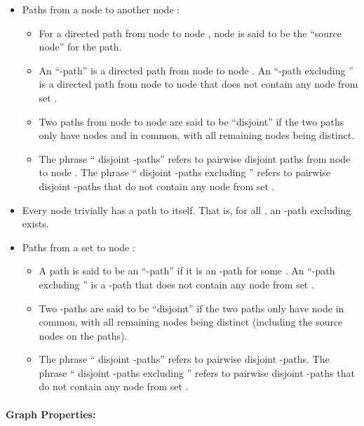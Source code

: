 \documentclass[letterpaper, 11pt]{article}
\begin{document}
\begin{itemize}
\item Paths from a node  to another node :
\begin{itemize}
\item For a directed path from node  to node , node  is said to be the ``source node'' for the path.
\item An ``-path'' is a directed path from node  to node . An ``-path excluding '' is a directed path from node  to node  that does not contain any node from set . 


\item Two paths from node  to node  are said to be ``disjoint'' 
	if the two paths only have nodes  and 
	in common, with all remaining
	nodes being distinct.
	
\item The phrase `` disjoint -paths'' refers to
	 pairwise disjoint paths from node  to node . The phrase `` disjoint -paths excluding '' refers to  pairwise disjoint -paths that do not contain any node from set .

\end{itemize}
\item Every node  trivially has a path to itself. That is,
	for all , an -path
	excluding  exists.
\item Paths from a set  to node :

\begin{itemize}
\item A path is said to be an ``-path'' if it is an
	-path for some . An ``-path excluding '' is a -path that does not contain any node from set .


\item Two -paths are said to be ``disjoint'' 
	if the two paths only have node 
	in common, with all remaining
	nodes being distinct (including the source nodes on the paths).
	
\item The phrase `` disjoint -paths'' refers to
	 pairwise disjoint -paths. The phrase `` disjoint -paths excluding '' refers to  pairwise disjoint -paths that do not contain any node from set .

\end{itemize}
\end{itemize}

\paragraph{Graph Properties:}
\end{document}
